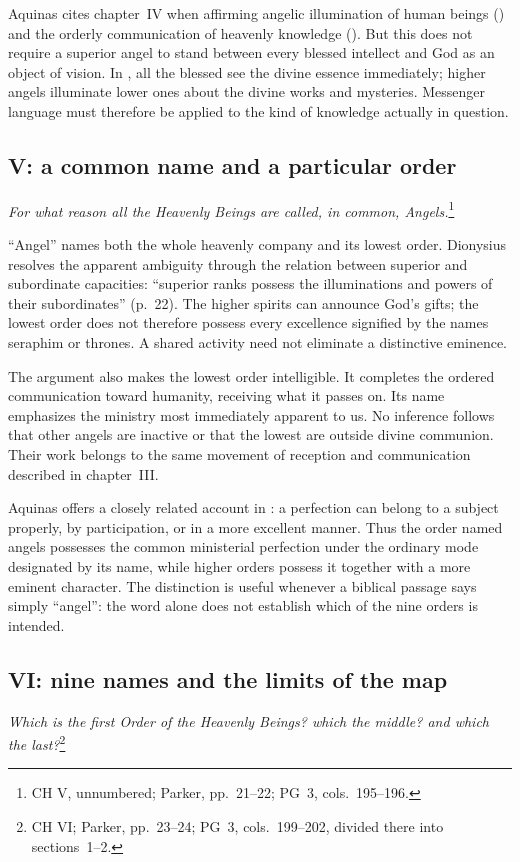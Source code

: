Aquinas cites chapter~IV when affirming angelic illumination of human beings () and the orderly communication of heavenly knowledge (). But this does not require a superior angel to stand between every blessed intellect and God as an object of vision. In , all the blessed see the divine essence immediately; higher angels illuminate lower ones about the divine works and mysteries. Messenger language must therefore be applied to the kind of knowledge actually in question.

\subsection{V: a common name and a particular order}
\emph{For what reason all the Heavenly Beings are called, in common, Angels.}\footnote{CH V, unnumbered; Parker, pp.~21--22; PG~3, cols.~195--196.}

``Angel'' names both the whole heavenly company and its lowest order. Dionysius resolves the apparent ambiguity through the relation between superior and subordinate capacities: ``superior ranks possess the illuminations and powers of their subordinates'' (p.~22). The higher spirits can announce God's gifts; the lowest order does not therefore possess every excellence signified by the names seraphim or thrones. A shared activity need not eliminate a distinctive eminence.

The argument also makes the lowest order intelligible. It completes the ordered communication toward humanity, receiving what it passes on. Its name emphasizes the ministry most immediately apparent to us. No inference follows that other angels are inactive or that the lowest are outside divine communion. Their work belongs to the same movement of reception and communication described in chapter~III.

Aquinas offers a closely related account in : a perfection can belong to a subject properly, by participation, or in a more excellent manner. Thus the order named angels possesses the common ministerial perfection under the ordinary mode designated by its name, while higher orders possess it together with a more eminent character. The distinction is useful whenever a biblical passage says simply ``angel'': the word alone does not establish which of the nine orders is intended.

\subsection{VI: nine names and the limits of the map}
\emph{Which is the first Order of the Heavenly Beings? which the middle? and which the last?}\footnote{CH VI; Parker, pp.~23--24; PG~3, cols.~199--202, divided there into sections~1--2.}

